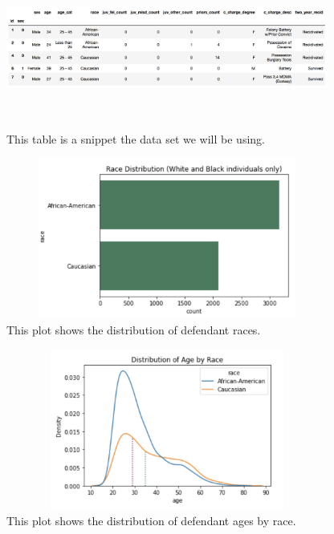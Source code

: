 \documentclass[water,article,submit,moreauthors,pdftex]{mdpi}
\begin{document}
\begin{figure}

{\centering \includegraphics[width=400px,height=200px]{../images/table_snippet} 

}

\caption{This table is a snippet the data set we will be using.}\label{fig:table snip}
\end{figure}

\begin{figure}

{\centering \includegraphics[width=400px,height=200px]{../images/race_bar_plot} 

}

\caption{This plot shows the distribution of defendant races.}\label{fig:race plot}
\end{figure}

\begin{figure}

{\centering \includegraphics[width=400px,height=200px]{../images/race_age_plot} 

}

\caption{This plot shows the distribution of defendant ages by race.}\label{fig:age plot}
\end{figure}
\end{document}
